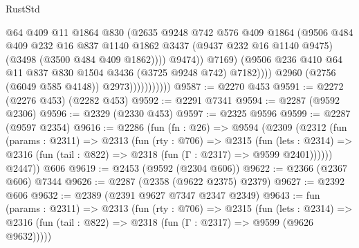 \begin{lexlean}{RustStd}
\begin{coremodule}
                                      @64
                                      @409
                                      @11
                                      @1864
                                      @830
                                      (@2635
                                        @9248
                                        @742
                                        @576
                                        @409
                                        @1864
                                        (@9506
                                          @484
                                          @409
                                          @232
                                          @16
                                          @837
                                          @1140
                                          @1862
                                          @3437
                                          (@9437 @232 @16 @1140 @9475)
                                          (@3498 (@3500 @484 @409 @1862))))
                                      @9474))
                                  @7169)
                                (@9506
                                  @236
                                  @410
                                  @64
                                  @11
                                  @837
                                  @830
                                  @1504
                                  @3436
                                  (@3725 @9248 @742)
                                  @7182))))
                          @2960
                          (@2756 (@6049 @585 @4148))
                          @2973)))))))))))
@9587 := @2270 @453
@9591 := @2272 (@2276 @453) (@2282 @453)
@9592 := @2291 @7341
@9594 := @2287 (@9592 @2306)
@9596 := @2329 (@2330 @453)
@9597 := @2325 @9596
@9599 := @2287 (@9597 @2354)
@9616 := @2286
    (fun (fn : @26) =>
    @9594
      (@2309
        (@2312
          (fun (params : @2311) =>
          @2313
            (fun (rty : @706) =>
            @2315
              (fun (lets : @2314) =>
              @2316 (fun (tail : @822) => @2318 (fun (Γ : @2317) => @9599 @2401))))))
        @2447))
    @606
@9619 := @2453 (@9592 (@2304 @606))
@9622 := @2366 (@2367 @606) @7344
@9626 := @2287 (@2358 (@9622 @2375) @2379)
@9627 := @2392 @606
@9632 := @2389 (@2391 @9627 @7347 @2347 @2349)
@9643 := fun (params : @2311) =>
  @2313
    (fun (rty : @706) =>
    @2315
      (fun (lets : @2314) =>
      @2316 (fun (tail : @822) => @2318 (fun (Γ : @2317) => @9599 (@9626 @9632)))))

\end{coremodule}
\end{lexlean}
